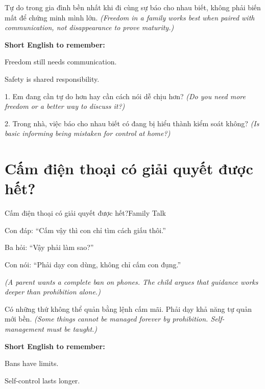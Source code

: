 \begin{baihoc}
Tự do trong gia đình bền nhất khi đi cùng sự báo cho nhau biết, không phải biến mất để chứng minh mình lớn.
\textit{(Freedom in a family works best when paired with communication, not disappearance to prove maturity.)}
\end{baihoc}

\begin{ghinhoanh}
\textbf{Short English to remember:}

Freedom still needs communication.

Safety is shared responsibility.
\end{ghinhoanh}

\begin{tuhocnhanh}
1. Em đang cần tự do hơn hay cần cách nói dễ chịu hơn? \textit{(Do you need more freedom or a better way to discuss it?)}

2. Trong nhà, việc báo cho nhau biết có đang bị hiểu thành kiểm soát không? \textit{(Is basic informing being mistaken for control at home?)}
\end{tuhocnhanh}
\ngancach

\section{Cấm điện thoại có giải quyết được hết?}
\begin{truyen}{Cấm điện thoại có giải quyết được hết?}{Family Talk}

Con đáp: ``Cấm vậy thì con chỉ tìm cách giấu thôi.''

Ba hỏi: ``Vậy phải làm sao?''

Con nói: ``Phải dạy con dùng, không chỉ cấm con đụng.''

\textit{(A parent wants a complete ban on phones. The child argues that guidance works deeper than prohibition alone.)}
\end{truyen}

\begin{baihoc}
Có những thứ không thể quản bằng lệnh cấm mãi. Phải dạy khả năng tự quản mới bền.
\textit{(Some things cannot be managed forever by prohibition. Self-management must be taught.)}
\end{baihoc}

\begin{ghinhoanh}
\textbf{Short English to remember:}

Bans have limits.

Self-control lasts longer.
\end{ghinhoanh}

